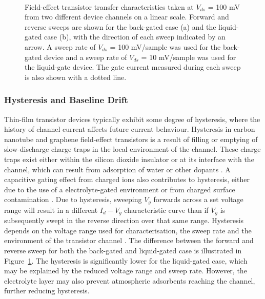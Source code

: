 \documentclass[
  a4paper,
]{scrbook}
\begin{document}
\begin{figure}
\begin{minipage}[t]{0.45\linewidth}
\end{minipage}%
%
\begin{minipage}[t]{0.01\linewidth}

{\centering 

~

}

\end{minipage}%

\caption{\label{fig-gating-hysteresis}Field-effect transistor transfer
characteristics taken at \(V_{ds}\) = 100 mV from two different device
channels on a linear scale. Forward and reverse sweeps are shown for the
back-gated case (a) and the liquid-gated case (b), with the direction of
each sweep indicated by an arrow. A sweep rate of \(V_{ds}\) = 100
mV/sample was used for the back-gated device and a sweep rate of
\(V_{ds}\) = 10 mV/sample was used for the liquid-gate device. The gate
current measured during each sweep is also shown with a dotted line.}

\end{figure}

\hypertarget{hysteresis-and-baseline-drift}{%
\subsubsection*{Hysteresis and Baseline
Drift}\label{hysteresis-and-baseline-drift}}

Thin-film transistor devices typically exhibit some degree of
hysteresis, where the history of channel current affects future current
behaviour. Hysteresis in carbon nanotube and graphene field-effect
transistors is a result of filling or emptying of slow-discharge charge
traps in the local environment of the channel. These charge traps exist
either within the silicon dioxide insulator or at its interface with the
channel, which can result from adsorption of water or other dopants
\autocite{McEuen2002,Kim2003,Wang2010}. A capacitive gating effect from
charged ions also contributes to hysteresis, either due to the use of a
electrolyte-gated environment or from charged surface contamination
\autocite{Wang2010,Yao2021}. Due to hysteresis, sweeping \(V_g\)
forwards across a set voltage range will result in a different
\(I_d - V_g\) characteristic curve than if \(V_g\) is subsequently swept
in the reverse direction over that same range. Hysteresis depends on the
voltage range used for characterisation, the sweep rate and the
environment of the transistor channel \autocite{Kim2003,Wang2010}. The
difference between the forward and reverse sweep for both the back-gated
and liquid-gated case is illustrated in
Figure~\ref{fig-gating-hysteresis}. The hysteresis is significantly
lower for the liquid-gated case, which may be explained by the reduced
voltage range and sweep rate. However, the electrolyte layer may also
prevent atmospheric adsorbents reaching the channel, further reducing
hysteresis.
\end{document}
